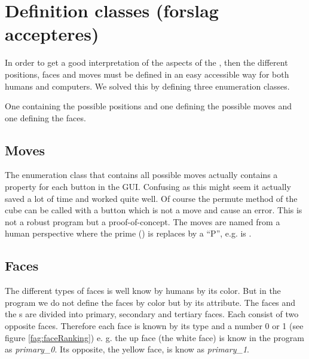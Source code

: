 \section{Definition classes (forslag accepteres)}
In order to get a good interpretation of the aspects of the \cube{}, then the different positions, faces and moves must be defined in an easy accessible way for both humans and computers. We solved this by defining three enumeration classes. 

One containing the possible positions and one defining the possible moves and one defining the faces.

\subsection{Moves}
The enumeration class that contains all possible moves actually contains a property for each button in the GUI. Confusing as this might seem it actually saved a lot of time and worked quite well. Of course the permute method of the cube can be called with a button which is not a move and cause an error. This is not a robust program but a proof-of-concept. 
The moves are named from a human perspective where the prime () is replaces by a ``P'', e.g.  is .

\subsection{Faces}
\label{sub:cubeFaces}
The different types of faces is well know by humans by its color.
But in the program we do not define the faces by color but by its \facelet{} attribute. 
The faces and the \facelet{}s are divided into primary, secondary and tertiary faces. 
Each consist of two opposite faces. Therefore each face is known by its type and a number 0 or 1 (see figure \ref{fag:faceRanking}) e. g. the up face (the white face) is know in the program as \textit{primary\_0}.
Its opposite, the yellow face, is know as \textit{primary\_1}. 

